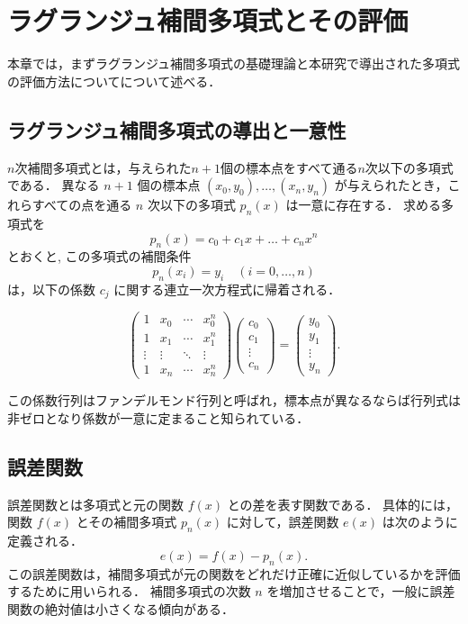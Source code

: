 \section{ラグランジュ補間多項式とその評価} %
\label{sec:lagrange_interpolation}
  本章では，まずラグランジュ補間多項式の基礎理論と本研究で導出された多項式の評価方法についてについて述べる．
  
  \subsection{ラグランジュ補間多項式の導出と一意性}
  \label{subsec:lagrange_derivation}
    $n$次補間多項式とは，与えられた$n+1$個の標本点をすべて通る$n$次以下の多項式である．
    異なる $n+1$ 個の標本点 $(x_0, y_0), \dots, (x_n, y_n)$ が与えられたとき，これらすべての点を通る $n$ 次以下の多項式 $p_n(x)$ は一意に存在する．
    求める多項式を \[p_n(x) = c_0 + c_1 x + \dots + c_n x^n\] とおくと,
    この多項式の補間条件 \[p_n(x_i) = y_i \quad (i=0,\dots,n)\] は，以下の係数 $c_j$ に関する連立一次方程式に帰着される．

    \begin{equation}
    \left(
    \begin{array}{cccc}
    1 & x_0 & \cdots & x_0^n \\
    1 & x_1 & \cdots & x_1^n \\
    \vdots & \vdots & \ddots & \vdots \\
    1 & x_n & \cdots & x_n^n
    \end{array}
    \right) 
    \left(
    \begin{array}{c}
    c_0 \\
    c_1 \\
    \vdots \\
    c_n
    \end{array}
    \right)
    =
    \left(
    \begin{array}{c}
    y_0 \\
    y_1 \\
    \vdots \\
    y_n
    \end{array}
    \right).
    \label{eq:matrix_interp}
    \end{equation}

    この係数行列はファンデルモンド行列と呼ばれ，標本点が異なるならば行列式は非ゼロとなり係数が一意に定まること知られている\cite{suchikaiseki-nyumon}．

  \label{subsec:error_function}
  \subsection{誤差関数}
    誤差関数とは多項式と元の関数 $f(x)$ との差を表す関数である．
    具体的には，関数 $f(x)$ とその補間多項式 $p_n(x)$ に対して，誤差関数 $e(x)$ は次のように定義される．
    \begin{equation}
      e(x) = f(x) - p_n(x).
    \end{equation}
    この誤差関数は，補間多項式が元の関数をどれだけ正確に近似しているかを評価するために用いられる．
    補間多項式の次数 $n$ を増加させることで，一般に誤差関数の絶対値は小さくなる傾向がある．
\label{subsec:polynomial_methods}
  
